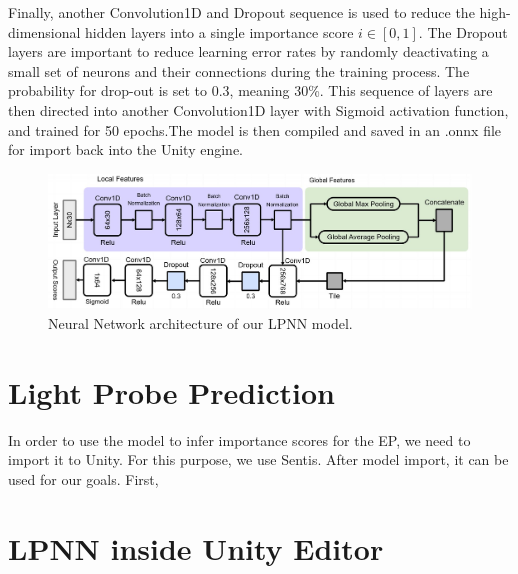 Finally, another Convolution1D and Dropout sequence is used to reduce the high-dimensional hidden layers into a single importance score $i \in [0,1]$. The Dropout layers are important to reduce learning error rates by randomly deactivating a small set of neurons and their connections during the training process. The probability for drop-out is set to 0.3, meaning 30\%. This sequence of layers are then directed into another Convolution1D layer with Sigmoid activation function, and trained for 50 epochs.The model is then compiled and saved in an .onnx file for import back into the Unity engine.

\begin{figure}[h]
	\centering
	\includegraphics[scale=0.392]{Graphics/LPNN.jpg}
	\caption{Neural Network architecture of our LPNN model.}
	\label{fig:LPNN_arch}
\end{figure}

\section{Light Probe Prediction}
In order to use the model to infer importance scores for the EP, we need to import it to Unity. For this purpose, we use Sentis. After model import, it can be used for our goals. First,

\section{LPNN inside Unity Editor}
\label{sec:LPNN_UI}
